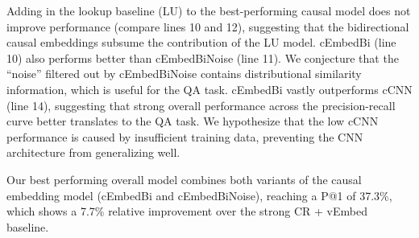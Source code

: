 Adding in the lookup baseline (LU) to the best-performing causal model does not improve performance (compare lines 10 and 12), suggesting that the bidirectional causal embeddings subsume the contribution of the LU model.  
cEmbedBi (line 10) also performs better than cEmbedBiNoise (line 11). We conjecture that the ``noise'' filtered out by cEmbedBiNoise contains distributional similarity information, which is useful for the QA task.  cEmbedBi vastly outperforms cCNN (line 14), suggesting that strong overall performance across the precision-recall curve better translates to the QA task.  We hypothesize that the low cCNN performance is caused by insufficient training data, preventing the CNN architecture from generalizing well. 

Our best performing overall model combines both variants of the causal embedding model (cEmbedBi and cEmbedBiNoise), reaching a P@1 of 37.3\%, which shows a 7.7\% relative improvement over the strong CR + vEmbed baseline.




